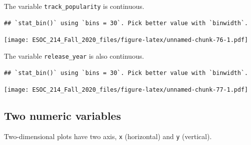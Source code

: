 \documentclass[
]{book}
\newenvironment{Shaded}{\begin{snugshade}}{\end{snugshade}}
\newcommand{\DataTypeTok}[1]{\textcolor[rgb]{0.13,0.29,0.53}{#1}}
\newcommand{\KeywordTok}[1]{\textcolor[rgb]{0.13,0.29,0.53}{\textbf{#1}}}
\newcommand{\NormalTok}[1]{#1}
\newcommand{\OperatorTok}[1]{\textcolor[rgb]{0.81,0.36,0.00}{\textbf{#1}}}
\newcommand{\StringTok}[1]{\textcolor[rgb]{0.31,0.60,0.02}{#1}}
\begin{document}
The variable \texttt{track\_popularity} is continuous.

\begin{Shaded}
\end{Shaded}

\begin{verbatim}
## `stat_bin()` using `bins = 30`. Pick better value with `binwidth`.
\end{verbatim}

\texttt{[image: ESOC\_214\_Fall\_2020\_files/figure-latex/unnamed-chunk-76-1.pdf]}

The variable \texttt{release\_year} is also continuous.

\begin{Shaded}
\end{Shaded}

\begin{verbatim}
## `stat_bin()` using `bins = 30`. Pick better value with `binwidth`.
\end{verbatim}

\texttt{[image: ESOC\_214\_Fall\_2020\_files/figure-latex/unnamed-chunk-77-1.pdf]}

\hypertarget{two-numeric-variables}{%
\subsection{Two numeric variables}\label{two-numeric-variables}}

Two-dimensional plots have two axis, \texttt{x} (horizontal) and \texttt{y} (vertical).

\begin{Shaded}
\end{Shaded}
\end{document}

